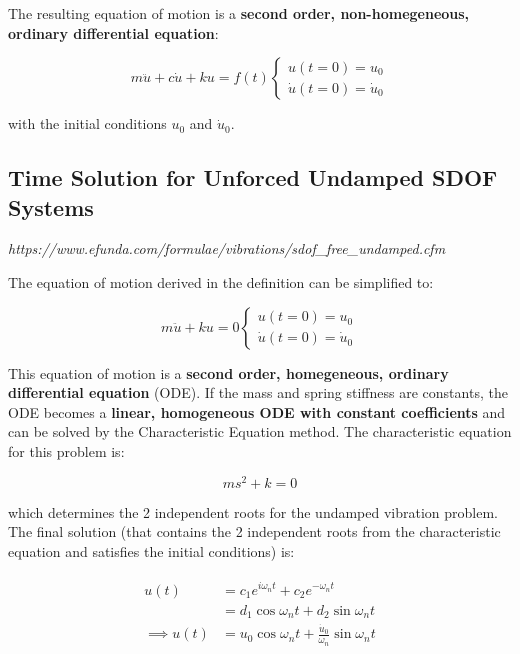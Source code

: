 \documentclass[10pt,b5paper,titlepage]{book}
\newenvironment{eqarray}
{
    \begin{eqnarray}
        \begin{aligned}
}
{
        \end{aligned}
    \end{eqnarray}
}
\begin{document}
The resulting equation of motion is a
\textbf{second order, non-homegeneous, ordinary differential equation}:

\begin{equation}
    m \ddot{u} + c \dot{u} + k u = f(t)
        \left\{ \begin{matrix}
                u(t=0) = u_0\\
                \dot{u}(t=0) = \dot{u}_0
          \end{matrix} \right.
\end{equation}

with the initial conditions $ u_0 $ and $ \dot{u}_0 $.


\subsection{Time Solution for Unforced Undamped SDOF Systems}

\textit{https://www.efunda.com/formulae/vibrations/sdof\_free\_undamped.cfm}

The equation of motion derived in the definition can be simplified to:

\begin{equation}
    m \ddot{u} + k u = 0
        \left\{ \begin{matrix}
                u(t=0) = u_0\\
                \dot{u}(t=0) = \dot{u}_0
          \end{matrix} \right.
\end{equation}

This equation of motion is a
\textbf{second order, homegeneous, ordinary differential equation} (ODE). If the mass
and spring stiffness are constants, the ODE becomes a
\textbf{linear, homogeneous ODE with constant coefficients} and can be solved
by the Characteristic Equation method. The characteristic equation for this
problem is:

\begin{equation}
    m s^2 + k = 0
\end{equation}

which determines the 2 independent roots for the undamped vibration problem.
The final solution (that contains the 2 independent roots from the characteristic
equation and satisfies the initial conditions) is:

\begin{eqarray}
    u(t) &= c_1 e^{i \omega_n t} + c_2 e^{- \omega_n t}\\
         &= d_1 \cos{\omega_n t} + d_2 \sin{\omega_n t} \\
    \implies u(t) &= u_0 \cos{\omega_n t} + \frac{\dot{u}_0}{\omega_n} \sin{\omega_n t}
\end{eqarray}
\end{document}
